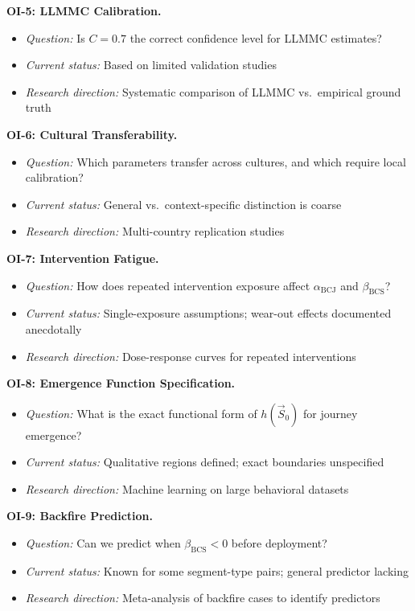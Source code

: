 \begin{tcolorbox}[colback=yellow!5!white, colframe=yellow!75!black,
    title=\textbf{Open Issues: Research Agenda for EIT}]
\textbf{OI-5: LLMMC Calibration.}
\begin{itemize}[nosep]
    \item \textit{Question:} Is $C = 0.7$ the correct confidence level for LLMMC estimates?
    \item \textit{Current status:} Based on limited validation studies
    \item \textit{Research direction:} Systematic comparison of LLMMC vs.\ empirical ground truth
\end{itemize}

\textbf{OI-6: Cultural Transferability.}
\begin{itemize}[nosep]
    \item \textit{Question:} Which parameters transfer across cultures, and which require local calibration?
    \item \textit{Current status:} General vs.\ context-specific distinction is coarse
    \item \textit{Research direction:} Multi-country replication studies
\end{itemize}

\textbf{OI-7: Intervention Fatigue.}
\begin{itemize}[nosep]
    \item \textit{Question:} How does repeated intervention exposure affect $\alpha_{\text{BCJ}}$ and $\beta_{\text{BCS}}$?
    \item \textit{Current status:} Single-exposure assumptions; wear-out effects documented anecdotally
    \item \textit{Research direction:} Dose-response curves for repeated interventions
\end{itemize}

\textbf{OI-8: Emergence Function Specification.}
\begin{itemize}[nosep]
    \item \textit{Question:} What is the exact functional form of $h(\vec{S}_0)$ for journey emergence?
    \item \textit{Current status:} Qualitative regions defined; exact boundaries unspecified
    \item \textit{Research direction:} Machine learning on large behavioral datasets
\end{itemize}

\textbf{OI-9: Backfire Prediction.}
\begin{itemize}[nosep]
    \item \textit{Question:} Can we predict when $\beta_{\text{BCS}} < 0$ before deployment?
    \item \textit{Current status:} Known for some segment-type pairs; general predictor lacking
    \item \textit{Research direction:} Meta-analysis of backfire cases to identify predictors
\end{itemize}


\end{tcolorbox}
